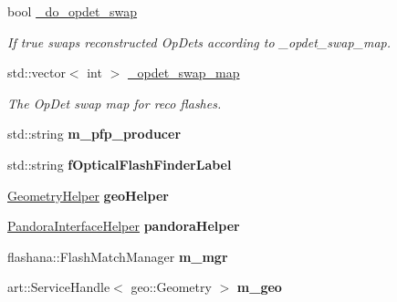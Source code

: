 \begin{DoxyCompactItemize}
\item 
\hypertarget{classlee_1_1ElectronEventSelectionAlg_af3cb19dac93bb287a5747ad4400c65ef}{bool \hyperlink{classlee_1_1ElectronEventSelectionAlg_af3cb19dac93bb287a5747ad4400c65ef}{\-\_\-do\-\_\-opdet\-\_\-swap}}\label{classlee_1_1ElectronEventSelectionAlg_af3cb19dac93bb287a5747ad4400c65ef}

\begin{DoxyCompactList}\small\item\em If true swaps reconstructed Op\-Dets according to \-\_\-opdet\-\_\-swap\-\_\-map. \end{DoxyCompactList}\item 
\hypertarget{classlee_1_1ElectronEventSelectionAlg_a3b8e7b46ec5b2db6008972662b2feb7f}{std\-::vector$<$ int $>$ \hyperlink{classlee_1_1ElectronEventSelectionAlg_a3b8e7b46ec5b2db6008972662b2feb7f}{\-\_\-opdet\-\_\-swap\-\_\-map}}\label{classlee_1_1ElectronEventSelectionAlg_a3b8e7b46ec5b2db6008972662b2feb7f}

\begin{DoxyCompactList}\small\item\em The Op\-Det swap map for reco flashes. \end{DoxyCompactList}\item 
\hypertarget{classlee_1_1ElectronEventSelectionAlg_a22dc43acead400d57a885ef5f4eadfe0}{std\-::string {\bfseries m\-\_\-pfp\-\_\-producer}}\label{classlee_1_1ElectronEventSelectionAlg_a22dc43acead400d57a885ef5f4eadfe0}

\item 
\hypertarget{classlee_1_1ElectronEventSelectionAlg_aab3778b534309c11083d606aad56191b}{std\-::string {\bfseries f\-Optical\-Flash\-Finder\-Label}}\label{classlee_1_1ElectronEventSelectionAlg_aab3778b534309c11083d606aad56191b}

\item 
\hypertarget{classlee_1_1ElectronEventSelectionAlg_a99a124186e74bce53dd84068083cc90d}{\hyperlink{classlee_1_1GeometryHelper}{Geometry\-Helper} {\bfseries geo\-Helper}}\label{classlee_1_1ElectronEventSelectionAlg_a99a124186e74bce53dd84068083cc90d}

\item 
\hypertarget{classlee_1_1ElectronEventSelectionAlg_ab6b3531c56323d02225e257a191d7a65}{\hyperlink{classlee_1_1PandoraInterfaceHelper}{Pandora\-Interface\-Helper} {\bfseries pandora\-Helper}}\label{classlee_1_1ElectronEventSelectionAlg_ab6b3531c56323d02225e257a191d7a65}

\item 
\hypertarget{classlee_1_1ElectronEventSelectionAlg_a49fb9654c5609485ae6745fdbb84335c}{flashana\-::\-Flash\-Match\-Manager {\bfseries m\-\_\-mgr}}\label{classlee_1_1ElectronEventSelectionAlg_a49fb9654c5609485ae6745fdbb84335c}

\item 
\hypertarget{classlee_1_1ElectronEventSelectionAlg_a6d19e99bac2aebf0710321e4b9d2d394}{art\-::\-Service\-Handle$<$ geo\-::\-Geometry $>$ {\bfseries m\-\_\-geo}}\label{classlee_1_1ElectronEventSelectionAlg_a6d19e99bac2aebf0710321e4b9d2d394}

\end{DoxyCompactItemize}


